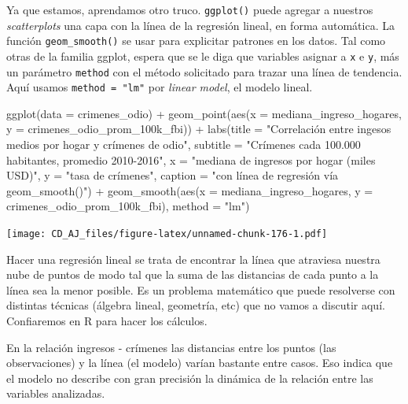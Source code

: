 \documentclass[
]{book}
\newenvironment{Shaded}{\begin{snugshade}}{\end{snugshade}}
\newcommand{\AttributeTok}[1]{\textcolor[rgb]{0.77,0.63,0.00}{#1}}
\newcommand{\FunctionTok}[1]{\textcolor[rgb]{0.00,0.00,0.00}{#1}}
\newcommand{\NormalTok}[1]{#1}
\newcommand{\SpecialCharTok}[1]{\textcolor[rgb]{0.00,0.00,0.00}{#1}}
\newcommand{\StringTok}[1]{\textcolor[rgb]{0.31,0.60,0.02}{#1}}
\begin{document}
Ya que estamos, aprendamos otro truco. \texttt{ggplot()} puede agregar a nuestros \emph{scatterplots} una capa con la línea de la regresión lineal, en forma automática. La función \texttt{geom\_smooth()} se usar para explicitar patrones en los datos. Tal como otras de la familia ggplot, espera que se le diga que variables asignar a \texttt{x} e \texttt{y}, más un parámetro \texttt{method} con el método solicitado para trazar una línea de tendencia. Aquí usamos \texttt{method\ =\ "lm"} por \emph{linear model}, el modelo lineal.

\begin{Shaded}
\begin{Highlighting}[]
\FunctionTok{ggplot}\NormalTok{(}\AttributeTok{data =}\NormalTok{ crimenes\_odio) }\SpecialCharTok{+} 
    \FunctionTok{geom\_point}\NormalTok{(}\FunctionTok{aes}\NormalTok{(}\AttributeTok{x =}\NormalTok{ mediana\_ingreso\_hogares, }\AttributeTok{y =}\NormalTok{ crimenes\_odio\_prom\_100k\_fbi)) }\SpecialCharTok{+}
    \FunctionTok{labs}\NormalTok{(}\AttributeTok{title =} \StringTok{"Correlación entre ingesos medios por hogar y crímenes de odio"}\NormalTok{,}
         \AttributeTok{subtitle =} \StringTok{"Crímenes cada 100.000 habitantes, promedio 2010{-}2016"}\NormalTok{,}
         \AttributeTok{x =} \StringTok{"mediana de ingresos por hogar (miles USD)"}\NormalTok{,}
         \AttributeTok{y =} \StringTok{"tasa de crímenes"}\NormalTok{,}
         \AttributeTok{caption =} \StringTok{"con línea de regresión vía geom\_smooth()"}\NormalTok{) }\SpecialCharTok{+}
    \FunctionTok{geom\_smooth}\NormalTok{(}\FunctionTok{aes}\NormalTok{(}\AttributeTok{x =}\NormalTok{ mediana\_ingreso\_hogares, }\AttributeTok{y =}\NormalTok{ crimenes\_odio\_prom\_100k\_fbi), }
                \AttributeTok{method =} \StringTok{"lm"}\NormalTok{)}
\end{Highlighting}
\end{Shaded}

\texttt{[image: CD\_AJ\_files/figure-latex/unnamed-chunk-176-1.pdf]}

Hacer una regresión lineal se trata de encontrar la línea que atraviesa nuestra nube de puntos de modo tal que la suma de las distancias de cada punto a la línea sea la menor posible. Es un problema matemático que puede resolverse con distintas técnicas (álgebra lineal, geometría, etc) que no vamos a discutir aquí. Confiaremos en R para hacer los cálculos.

En la relación ingresos - crímenes las distancias entre los puntos (las observaciones) y la línea (el modelo) varían bastante entre casos. Eso indica que el modelo no describe con gran precisión la dinámica de la relación entre las variables analizadas.
\end{document}
